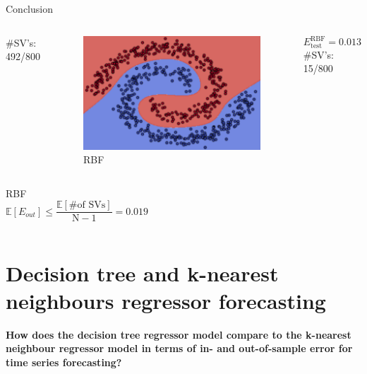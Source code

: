 \documentclass[9.5pt]{beamer}
\begin{document}
\begin{frame}{Conclusion}
\begin{columns}[onlytextwidth]
            #SV’s: 492/800
            \centering
            \begin{figure}
                \centering
                \includegraphics[width=\linewidth]{image-20220624192258535}
                \caption{RBF}
            \end{figure}
            \[E_{\text{test}}^{\text{RBF}} = 0.013\]
            #SV’s: 15/800
        \end{columns}

        \bigskip
        \bigskip

        \small
        \begin{columns}
            \begin{block}{RBF}
                \[\mathbb{E}[E_{out}] \le \frac{\mathbb{E}[\text{\# of SVs}]}{\text{N} - 1} = 0.019\]
            \end{block}
        \end{columns}
    \end{frame}


    \section{Decision tree and k-nearest neighbours regressor forecasting}
    \begin{frame}
        \textbf{How does the decision tree regressor model compare to the k-nearest neighbour regressor model in terms of in- and out-of-sample error for time series forecasting?}
    \end{frame}
\end{document}

